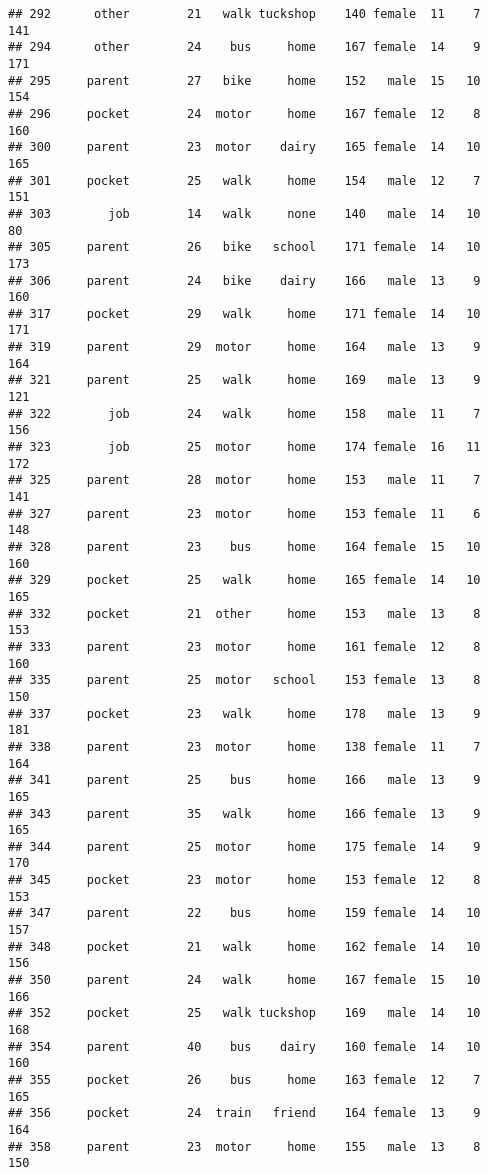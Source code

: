 \documentclass[
]{article}
\begin{document}
\begin{verbatim}
## 292      other        21   walk tuckshop    140 female  11    7     141
## 294      other        24    bus     home    167 female  14    9     171
## 295     parent        27   bike     home    152   male  15   10     154
## 296     pocket        24  motor     home    167 female  12    8     160
## 300     parent        23  motor    dairy    165 female  14   10     165
## 301     pocket        25   walk     home    154   male  12    7     151
## 303        job        14   walk     none    140   male  14   10      80
## 305     parent        26   bike   school    171 female  14   10     173
## 306     parent        24   bike    dairy    166   male  13    9     160
## 317     pocket        29   walk     home    171 female  14   10     171
## 319     parent        29  motor     home    164   male  13    9     164
## 321     parent        25   walk     home    169   male  13    9     121
## 322        job        24   walk     home    158   male  11    7     156
## 323        job        25  motor     home    174 female  16   11     172
## 325     parent        28  motor     home    153   male  11    7     141
## 327     parent        23  motor     home    153 female  11    6     148
## 328     parent        23    bus     home    164 female  15   10     160
## 329     pocket        25   walk     home    165 female  14   10     165
## 332     pocket        21  other     home    153   male  13    8     153
## 333     parent        23  motor     home    161 female  12    8     160
## 335     parent        25  motor   school    153 female  13    8     150
## 337     pocket        23   walk     home    178   male  13    9     181
## 338     parent        23  motor     home    138 female  11    7     164
## 341     parent        25    bus     home    166   male  13    9     165
## 343     parent        35   walk     home    166 female  13    9     165
## 344     parent        25  motor     home    175 female  14    9     170
## 345     pocket        23  motor     home    153 female  12    8     153
## 347     parent        22    bus     home    159 female  14   10     157
## 348     pocket        21   walk     home    162 female  14   10     156
## 350     parent        24   walk     home    167 female  15   10     166
## 352     pocket        25   walk tuckshop    169   male  14   10     168
## 354     parent        40    bus    dairy    160 female  14   10     160
## 355     pocket        26    bus     home    163 female  12    7     165
## 356     pocket        24  train   friend    164 female  13    9     164
## 358     parent        23  motor     home    155   male  13    8     150

\end{verbatim}
\end{document}
